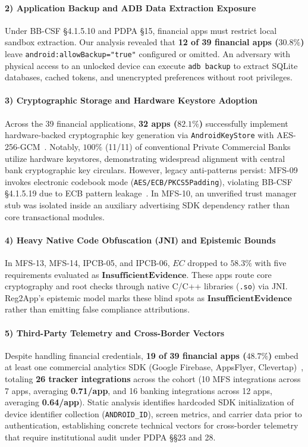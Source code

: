 \paragraph{2) Application Backup and ADB Data Extraction Exposure} Under BB-CSF §4.1.5.10 and PDPA §15, financial apps must restrict local sandbox extraction. Our analysis revealed that \textbf{12 of 39 financial apps ($30.8\%$)} leave \texttt{android:allowBackup="true"} configured or omitted. An adversary with physical access to an unlocked device can execute \texttt{adb backup} to extract SQLite databases, cached tokens, and unencrypted preferences without root privileges.

\paragraph{3) Cryptographic Storage and Hardware Keystore Adoption} Across the 39 financial applications, \textbf{32 apps ($82.1\%$)} successfully implement hardware-backed cryptographic key generation via \texttt{AndroidKeyStore} with AES-256-GCM~\cite{ekberg_tee}. Notably, $100\%$ (11/11) of conventional Private Commercial Banks utilize hardware keystores, demonstrating widespread alignment with central bank cryptographic key circulars. However, legacy anti-patterns persist: MFS-09 invokes electronic codebook mode (\texttt{AES/ECB/PKCS5Padding}), violating BB-CSF §4.1.5.19 due to ECB pattern leakage~\cite{crypto_misuse_ccs}. In MFS-10, an unverified trust manager stub was isolated inside an auxiliary advertising SDK dependency rather than core transactional modules.

\paragraph{4) Heavy Native Code Obfuscation (JNI) and Epistemic Bounds} In MFS-13, MFS-14, IPCB-05, and IPCB-06, $EC$ dropped to $58.3\%$ with five requirements evaluated as $\mathbf{InsufficientEvidence}$. These apps route core cryptography and root checks through native C/C++ libraries (\texttt{.so}) via JNI. Reg2App's epistemic model marks these blind spots as $\mathbf{InsufficientEvidence}$ rather than emitting false compliance attributions.

\paragraph{5) Third-Party Telemetry and Cross-Border Vectors} Despite handling financial credentials, \textbf{19 of 39 financial apps ($48.7\%$)} embed at least one commercial analytics SDK (Google Firebase, AppsFlyer, Clevertap)~\cite{binns_third_party_trackers}, totaling \textbf{26 tracker integrations} across the cohort (10 MFS integrations across 7 apps, averaging \textbf{0.71/app}, and 16 banking integrations across 12 apps, averaging \textbf{0.64/app}). Static analysis identifies hardcoded SDK initialization of device identifier collection (\texttt{ANDROID\_ID}), screen metrics, and carrier data prior to authentication, establishing concrete technical vectors for cross-border telemetry that require institutional audit under PDPA §§23 and 28.

